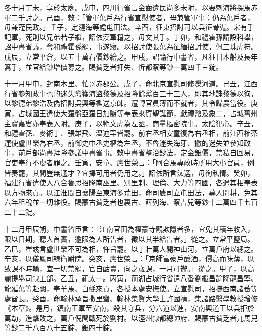\begin{pinyinscope}
 冬十月丁未，享於太廟。戊申，四川行省言金齒遺民尚多未附，以要剌海將探馬赤軍二千討之。己酉，敕：「管軍萬戶為行省宣慰使者，毋兼管軍事；仍為萬戶者，毋兼蒞民政。」壬子，定漣海等處屯田法。辛酉，征東招討司以兵征骨嵬。宋有手記軍，死則以兄弟若子繼，詔依漢軍籍之，毋文其手。丁卯，和禮霍孫請設科舉，詔中書省議，會和禮霍孫罷，事遂寢。以招討使張萬為征緬招討使，佩三珠虎符。戊辰，立常平倉，以五十萬石價鈔給之。甲戌，詔諭行中書省，凡征日本船及長年篙手，並官給鈔增價募之。賜貧乏者押失、忻都察等鈔一萬四千三錠。



 十一月甲申，封南木里、忙哥赤郡公。戊子，命北京宣慰司修灤河道。己丑，江西行省參知政事也的迷失禽獲海盜黎德及招降餘黨百三十三人，即其地誅黎德以徇，以黎德弟黎浩及偽招討吳興等檻送京師。遷轉官員薄而不就者，其令歸農當役。庚寅，占城國王遣使大羅盤亞羅日加翳等奉表來賀聖誕節，獻禮幣及象二，占城舊州主寶嘉婁亦奉表入附。庚子，以範文虎為左丞，商量樞密院事。太陰犯心。辛丑，和禮霍孫、麥術丁、張雄飛、溫迪罕皆罷。前右丞相安童復為右丞相，前江西榷茶運使盧世榮為右丞，前御史中丞史樞為左丞，不魯迷失海牙、撒的迷失並參知政事，前戶部尚書拜降參議中書省事。敕中書省整治鈔法，定金銀價，禁私自回易，官吏奉行不虔者罪之。壬寅，安童、盧世榮言：「阿合馬專政時所用大小官員，例皆奏罷，其間豈無通才？宜擇可用者仍用之。」詔依所言汰選，毋徇私情。癸卯，福建行省遣使入八合魯思招降南巫里、別里剌、理倫、大力等四國，各遣其相奉表以方物來貢。以江淮間自襄陽至東海多荒田，命司農司立屯田法，募人開耕，免其六年租稅並一切雜役。賜蒙古貧乏者也裏古、薛列海、察吉兒等鈔十二萬四千七百二十二錠。



 十二月甲辰朔，中書省臣言：「江南官田為權豪寺觀欺隱者多，宜免其積年收入，限以日期，聽人首實，逾限為人所告者，徵以其半給告者。」從之。立常平鹽局。乙巳，崔彧言盧世榮不可為相，忤旨罷。以丁壯萬人開神山河，立萬戶府以總之。辛亥，以儀鳳司隸衛尉院。癸亥，盧世榮言：「京師富豪戶釀酒，價高而味薄，以致課不時輸，宜一切禁罷，官自酤賣，向之歲課，一月可辦。」從之。甲子，以高麗提舉司隸工部。乙丑，祀太一。丙寅，荊湖占城行省遣八番劉繼昌諭降龍昌寧、龍延萬等赴闕，奉羊馬、白氈來貢，各授本處安撫使。立宣慰司，招撫西南諸蕃等處酋長。癸酉，命翰林承旨撒里蠻、翰林集賢大學士許國禎，集諸路醫學教授增修《本草》。是月，鎮南王軍至安南，殺其守兵，分六道以進，安南興道王以兵拒於萬劫，進擊敗之，萬戶倪閏戰死於劉村。以涇州隸都總帥府、賜蒙古貧乏者兀馬兒等鈔二千八百八十五錠、銀四十錠。




\end{pinyinscope}
